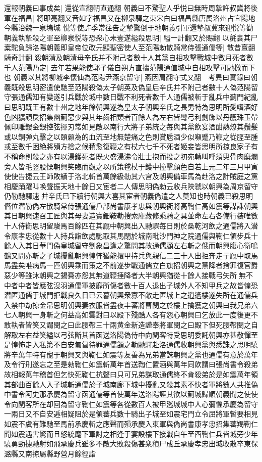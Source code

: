 還報朝義曰事成矣|{
	還從宣翻朝直通翻}
朝義曰不驚聖人乎悦曰無時周摯許叔冀將後軍在福昌|{
	將即亮翻又音如字福昌又在柳泉驛之東宋白曰福昌縣唐属洛州占宜陽地今縣治魏一泉塢城}
悦等使許季常往告之摯驚倒于地朝義引軍還摯叔冀來迎悦等勸朝義執摯殺之軍至柳泉悦等恐衆心未壹遂縊殺思明|{
	縊一計翻又於賜翻}
以氈裹其尸槖駝負歸洛陽朝義即皇帝位改元顯聖密使人至范陽勅散騎常侍張通儒等|{
	散昔亶翻騎奇計翻}
殺朝清及朝清母辛氏并不附己者數十人其黨自相攻擊戰城中數月死者數千人范陽乃定|{
	去年若果能使郭子儀自朔方直擣范陽通值城中自相攻擊可馳檄而下也}
朝義以其將柳城李懷仙為范陽尹燕京留守|{
	燕因肩翻守式又翻　考異曰實錄曰朝義既殺思明密遣使馳至范陽殺偽太子朝英及偽皇后辛氏并不附己者數十人偽范陽留守張通儒知有變遂引兵戰於城中數日戰不利死者數千人通儒被斬于亂兵中薊門紀亂曰思明既王有數十州之地年餘朝興遂為皇太子朝興辛氏之長男特為思明所愛嗜酒好色凶獷頑戾招集幽薊惡少與其年齒相類者百餘人為左右皆彎弓利劍飾以丹雘珠玉帶佩印雕鏤金銀控弦揮刃常如見敵以南行大將子弟統之每與其黨飲宴酒酣爇燎其鬚髮或以銅弹丸擊之以頤顙為的血流至地無楚痛之色則賞巵酒少似嚬蹙乃鞭之從脛至腫或至數千困絶將殞方捨之候稍愈復鞭之有杖六七千不死者姬妾皆思明所掠良家子有不稱命則殺之亦有以湯鑊死者既火盛湯沸令壯士抱而投之初宛轉叫呼須臾骨肉糜爛旁人皆毛竪股慄朝興笑臨而觀之以所策毬杖于鑊中撞擊顔色自若上元二年三月甲寅使使告捷云王師敗績于洛北斬首萬餘級勒其六宫及朝興備車馬為赴洛之計賊庭之黨相慶踊躍叫唤聲振天地十餘日又宦者二人傳思明偽勑云收兵陜虢以朝興為周京留守仍勒馳驛速并辛氏已下續行朝興大喜其宦者朝義偽遣之人莫知也時朝義已殺思明僭位濳勒偽左散騎常侍張通儒戶部尚書康孝忠與朝興衙將高鞫仁高如震等謀誅朝興其日朝興速召工匠與其母妻造寶鈿鞍勒搜索庫藏修乘騎之具並命左右各備行装唯數十人侍衛思明留駿馬百餘匹在其厩中朝興出入馳驟每日則於桑乾河飲之通儒將入潜令康孝忠從數十人持兵詣飲處馳取其馬閉於城南毗沙門神之院通儒與鞫仁領步兵十餘人入其日華門偽皇城留守劉象昌逢之驚問其故通儒顧左右斬之俄而朝興腹心衛鳴鶴又問亦斬之子城擾亂朝興惶怖猶能擐甲持兵與親信二三十人出拒奔走亍厩中取馬馬盡矣唯病馬一匹朝興乘而策之不前遂步戰通儒立白旗招朝興之黨降者捨罪復官爵惡少等雖沐朝興之錫賚亦怨其無道鞭捶降者大半朝興猶從十餘人接戰弓矢所無不中者中者皆應弦沒羽通儒軍披靡所傷者數十百人退出子城外人不知甲兵之故皆惶恐潜匿通儒于城門拒戰良久日已云暮朝興衆寡不敵走匿城上之逍遙樓遂失所在通儒兵入禁中劫掠金帛思明朝興妻衣服皆盡夜丰蕃將曹閔之於樓上擒獲之朝興曰我兄弟六七人朝興一身斬之何益高如雲對曰以殿下殘酷人各有怨心朝興曰乞放此一度後更不敢執者皆笑又謂閔之曰此腰帶三十兩黄金新造謹奉將軍閔之曰殿下但死腰帶閔之自解取左右益笑縊以弓弦斷其首函送洛陽偽侍中向閏客特受思明委託朝興亦甚敬憚至是惶怖走入私第不自安匍匐待罪通儒頷之勒馳驛赴洛通儒收朝興黨與悉誅之思明驍將辛萬年特有寵于朝興叉與鞫仁如震等友善為兄弟當誅朝興之黨也通儒有意於萬年及令行刑遂忘之至是勑鞫仁如震斬萬年首送鞫仁置酒與萬年同飲謂曰張尚書令殺弟故相報萬年稽首但乞快死鞫仁抗聲曰只可兄弟謀取通儒終不肯殺弟於是如震萬年領其部曲百餘人入子城斬通儒於子城南廊下城中擾亂又殺其素不快者軍將數人共推偽中書令阿史那承慶為留守函通儒等首使萬年送洛陽誣其欲以薊城歸順朝義聞之使使令向閏客所在却回為留守鞫仁如震等各從數百人被甲廵城城中人心彌懼承慶為留守一兩日又不自安逓相疑阻於是領蕃兵數十騎出子城至如震宅門立令屈將軍暫要相見如震不虞有難馳至馬前承慶斬之應聲而殞承慶入東軍與偽尚書康孝忠招集蕃羯鞫仁聞如震遇害驚而且怒統麾下軍討之相逢于宴設樓下接戰自午至酉鞫仁兵皆城旁少年驍勇勁捷馳射如飛承慶兵雖多不敵大敗殺傷甚衆積尸成丘承慶孝忠出城收散卒東保潞縣又南掠屬縣野營月餘徑詣}
